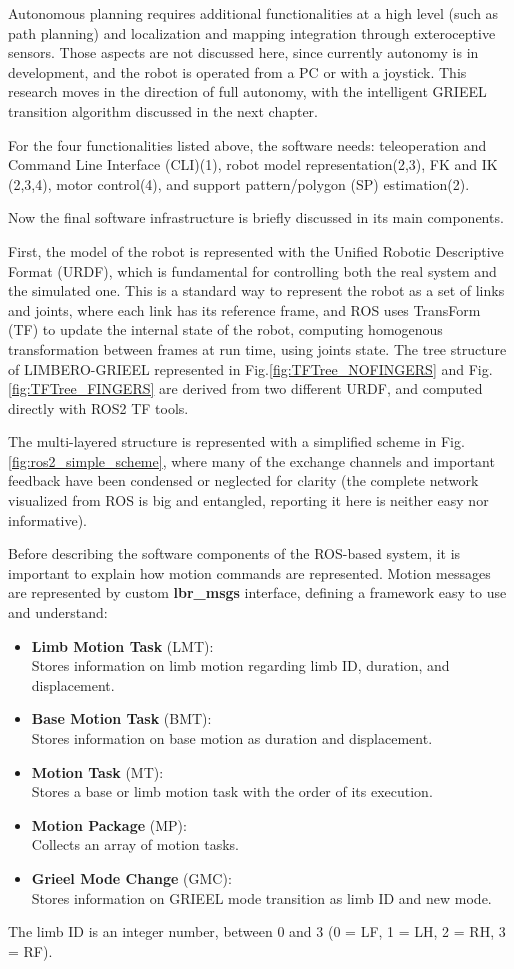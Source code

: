 Autonomous planning requires additional functionalities at a high level (such as path planning) and localization and mapping integration through exteroceptive sensors. Those aspects are not discussed here, since currently autonomy is in development, and the robot is operated from a PC or with a joystick. This research moves in the direction of full autonomy, with the intelligent GRIEEL transition algorithm discussed in the next chapter.   

For the four functionalities listed above, the software needs: teleoperation and Command Line Interface (CLI)(1), robot model representation(2,3),  FK and IK (2,3,4), motor control(4), and support pattern/polygon (SP) estimation(2).

Now the final software infrastructure is briefly discussed in its main components.

First, the model of the robot is represented with the Unified Robotic Descriptive Format (URDF), which is fundamental for controlling both the real system and the simulated one. This is a standard way to represent the robot as a set of links and joints, where each link has its reference frame, and ROS uses TransForm (TF) to update the internal state of the robot, computing homogenous transformation between frames at run time, using joints state.
The tree structure of LIMBERO-GRIEEL represented in Fig.\ref{fig:TFTree_NOFINGERS} and Fig.\ref{fig:TFTree_FINGERS} are derived from two different URDF, and computed directly with ROS2 TF tools. 

The multi-layered structure is represented with a simplified scheme in Fig.\ref{fig:ros2_simple_scheme}, where many of the exchange channels and important feedback have been condensed or neglected for clarity (the complete network visualized from ROS is big and entangled, reporting it here is neither easy nor informative).

Before describing the software components of the ROS-based system, it is important to explain how motion commands are represented. Motion messages are represented by custom \textbf{lbr\_msgs} interface, defining a framework easy to use and understand: 
\begin{itemize}
    \setlength\itemsep{-0.7em} 
    \item \textbf{Limb Motion Task} (LMT):\\ Stores information on limb motion regarding limb ID, duration, and displacement.
    \item \textbf{Base Motion Task} (BMT):\\ Stores information on base motion as duration and displacement.
    \item \textbf{Motion Task} (MT): \\Stores a base or limb motion task with the order of its execution.
    \item \textbf{Motion Package} (MP):\\ Collects an array of motion tasks.
    \item \textbf{Grieel Mode Change} (GMC): \\Stores information on GRIEEL mode transition as limb ID and new mode.
\end{itemize}
The limb ID is an integer number, between 0 and 3 (0 = LF, 1 = LH, 2 = RH, 3 = RF). 

